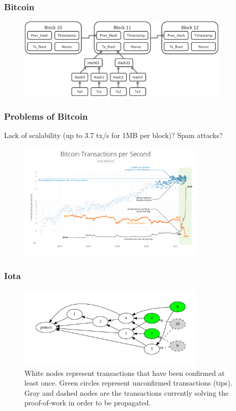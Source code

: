 \documentclass{beamer}
\begin{document}
\begin{frame}
\frametitle{Bitcoin}

\begin{figure}
\includegraphics[width=0.9\textwidth]{./images-defense/bitcoin-blockchain.png}
\end{figure}

\end{frame}


\begin{frame}
\frametitle{Problems of Bitcoin}

Lack of scalability (up to 3.7 tx/s for 1MB per block)? Spam attacks?

\begin{figure}
\includegraphics[width=0.8\textwidth]{./images-defense/bitcoin-congestion.png}
\end{figure}

\end{frame}


\begin{frame}
\frametitle{Iota}

\begin{figure}
\centering\includegraphics[width=0.8\textwidth]{./images01/fig-tangle-example.pdf}
\caption{White nodes represent transactions that have been confirmed at least once. Green circles represent unconfirmed transactions (tips). Gray and dashed nodes are the transactions currently solving the proof-of-work in order to be propagated.\label{fig-tangle-example}}
\end{figure}

\end{frame}
\end{document}
